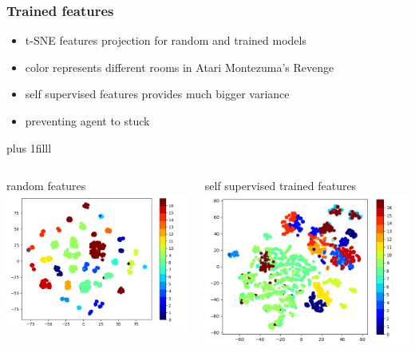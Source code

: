 \documentclass{beamer}
\begin{document}
\begin{frame}
  \frametitle{Trained features}

  \begin{itemize}
    \item t-SNE features projection for random and trained models
    \item color represents different rooms in Atari Montezuma's Revenge 
    \item self supervised features provides much bigger variance
    \item preventing agent to stuck
  \end{itemize} 
  
  \vskip 0pt plus 1filll 
  \begin{columns}
  
    \begin{column}{0.5\textwidth}
      random features
      \bigskip
      \includegraphics[scale=0.35]{../images/cnd_random.png}
    \end{column}

    \begin{column}{0.5\textwidth}
      self supervised trained features
      \bigskip
      \includegraphics[scale=0.35]{../images/cnd_trained.png}
    \end{column}
  

\end{columns}
\end{frame}
\end{document}
